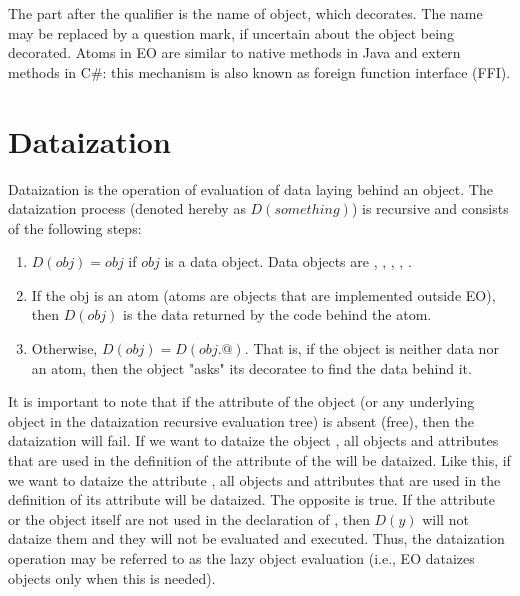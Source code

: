 \documentclass[12pt]{book}
\begin{document}
{The  part after the \ff{/} qualifier is the name of object, which  decorates. The name may be replaced by a question mark, if uncertain about the object being decorated. Atoms in EO are similar to native methods in Java and extern methods in C\#: this mechanism is also known as foreign function interface (FFI).

\section{Dataization} \label{sec:dataization}
Dataization is the operation of evaluation of data laying behind an object. The dataization process (denoted hereby as $D(something)$) is recursive and consists of the following steps:

\begin{enumerate}
    \item $D(obj) = obj$ if $obj$ is a data object. Data objects are , , , , .
    \item If the obj is an atom (atoms are objects that are implemented outside EO), then $D(obj)$ is the data returned by the code behind the atom.
    \item Otherwise, $D(obj) = D(obj.@)$. That is, if the object is neither data nor an atom, then the object "asks" its decoratee to find the data behind it.
\end{enumerate}

It is important to note that if the  attribute of the object (or any underlying object in the dataization recursive evaluation tree) is absent (free), then the dataization will fail.
If we want to dataize the object , all objects and attributes that are used in the definition of the  attribute of the  will be dataized. Like this, if we want to dataize the attribute , all objects and attributes that are used in the definition of its  attribute will be dataized.
The opposite is true. If the attribute  or the object  itself are not used in the declaration of , then $D(y)$ will not dataize them and they will not be evaluated and executed. Thus, the dataization operation may be referred to as the lazy object evaluation (i.e., EO dataizes objects only when this is needed).


}
\end{document}
